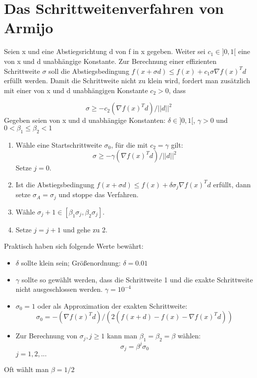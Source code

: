 \section{Das Schrittweitenverfahren von Armijo}

Seien x und eine Abstiegsrichtung d von f in x gegeben. Weiter sei
$c_1 \in ]0, 1[$ eine von x und d unabhängige Konstante. Zur Berechnung
einer effizienten Schrittweite $\sigma$ soll die Abstiegsbedingung
$f(x + \sigma d) \leq f(x) + c_1 \sigma \nabla f(x)^Td$
erfüllt werden. Damit die Schrittweite nicht zu klein wird, fordert man
zusätzlich mit einer von x und d unabhängigen Konstante $c_2 > 0$, dass

\begin{equation}
\sigma \geq -c_2 (\nabla f(x)^Td) / ||d||^2 
\end{equation}
Gegeben seien von x und d unabhängige Konstanten:
$\delta \in ]0, 1[$, $\gamma > 0$ und $0 < \beta_1 \leq \beta_2 < 1$

\begin{enumerate}
	\item  Wähle eine Startschrittweite $\sigma_0$, für die mit $c_2 = \gamma$ gilt:
	\begin{equation}
	\sigma \geq - \gamma (\nabla f(x)^Td)/||d||^2
	\end{equation}
	Setze $j = 0$.
	\item Ist die Abstiegsbedingung
	 $f(x + \sigma d) \leq f(x) + \delta \sigma_j \nabla f(x)^Td$
	 erfüllt, dann setze $\sigma_A = \sigma_j$ und stoppe das Verfahren.
	\item Wähle $\sigma_j+ 1 \in [\beta_1 \sigma_j , \beta_2 \sigma_j ]$.
	\item Setze $j = j + 1$ und gehe zu 2.
\end{enumerate}


Praktisch haben sich folgende Werte bewährt:
\begin{itemize}
\item $\delta$ sollte klein sein; Größenordnung: $\delta = 0.01$
\item$\gamma$ sollte so gewählt werden, dass die Schrittweite 1 und die exakte
Schrittweite nicht ausgeschlossen werden. $\gamma = 10^{-4}$
\item $\sigma_0 = 1$ oder als Approximation der exakten Schrittweite:
\begin{equation}
\sigma_0 = - (\nabla f(x)^T d) / (2 (f(x + d) - f(x) - \nabla f(x)^T d))
\end{equation}
\item Zur Berechnung von $\sigma_j,j \geq 1$ kann man $\beta_1 = \beta_2 = \beta$ wählen:
\begin{equation}
\sigma_j = \beta^j \sigma_0 
\end{equation}
$j = 1, 2, . . .$

\end{itemize}
Oft wählt man $\beta = 1/2$

